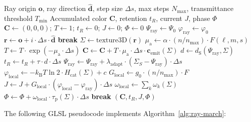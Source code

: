 \documentclass[11pt,twocolumn,a4paper]{article}
\newcommand{\kb}{k_{\mathrm{B}}}
\newcommand{\taup}{\tau_{\mathrm{p}}}
\newcommand{\dS}{d_{\mathrm{S}}}
\newcommand{\muabs}{\mu_{\mathrm{a}}}
\begin{document}
\begin{algorithm}[H]
\caption{Triple-Observation Ray March}
\label{alg:ray-march}
\begin{algorithmic}[1]
\Require Ray origin $\mathbf{o}$, ray direction $\hat{\mathbf{d}}$,
  step size $\Delta s$, max steps $N_{\max}$, transmittance threshold
  $T_{\min}$
\Ensure Accumulated color $\mathbf{C}$, retention $t_R$, current $J$,
  phase $\Phi$
\State $\mathbf{C} \gets (0,0,0)$; $T \gets 1$; $t_R \gets 0$;
  $J \gets 0$; $\Phi \gets 0$
\State $\Psi_{\mathrm{ray}} \gets \Psi_0$ 
\State $\varphi_{\mathrm{ray}} \gets \varphi_0$ 
  \State $\mathbf{r} \gets \mathbf{o} + i \cdot \Delta s \cdot
    \hat{\mathbf{d}}$ 
   \textbf{break}
  \EndIf
  \State $\Sigma \gets \text{texture3D}(\mathbf{r})$
  \State {}
  \State $\muabs \gets \alpha \cdot (n/n_{\max}) \cdot F(\ell,m,s)$
  \State $T \gets T \cdot \exp(-\muabs \cdot \Delta s)$
  \State $\mathbf{C} \gets \mathbf{C} + T \cdot \muabs \cdot
    \Delta s \cdot \mathbf{c}_{\mathrm{emit}}(\Sigma)$
  \State {}
  \State $d \gets \dS(\Psi_{\mathrm{ray}}, \Sigma)$
  \State $t_R \gets t_R + \tau \cdot d \cdot \Delta s$
  \State $\Psi_{\mathrm{ray}} \gets \Psi_{\mathrm{ray}} +
    \lambda_{\mathrm{adapt}} \cdot (\Sigma_S - \Psi_{\mathrm{ray}})
    \cdot \Delta s$ 
  \State {}
  \State $\varphi_{\mathrm{local}} \gets -\kb T \ln 2 \cdot
    H_{\mathrm{cat}}(\Sigma) + c$
  \State $G_{\mathrm{local}} \gets g_0 \cdot (n/n_{\max}) \cdot F$
  \State $J \gets J + G_{\mathrm{local}} \cdot
    (\varphi_{\mathrm{local}} - \varphi_{\mathrm{ray}}) \cdot \Delta s$
  \State {}
  \State $\omega_{\mathrm{local}} \gets \sum_k \omega_k(\Sigma)$
  \State $\Phi \gets \Phi + \omega_{\mathrm{local}} \cdot \taup(\Sigma)
    \cdot \Delta s$
  \State {}
   \textbf{break}
  \EndIf
\EndFor
\State \Return $(\mathbf{C}, t_R, J, \Phi)$
\end{algorithmic}
\end{algorithm}

The following GLSL pseudocode implements Algorithm~\ref{alg:ray-march}:
\end{document}
